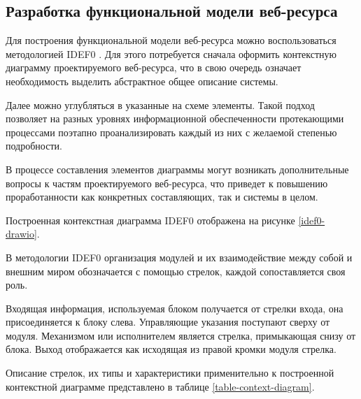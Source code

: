 \subsection{Разработка функциональной модели веб-ресурса}

Для построения функциональной модели веб-ресурса можно воспользоваться методологией IDEF0 \cite{wiki-idef0}.
Для этого потребуется сначала оформить контекстную диаграмму проектируемого веб-ресурса, что в свою очередь означает необходимость выделить абстрактное общее описание системы.

Далее можно углубляться в указанные на схеме элементы.
Такой подход позволяет на разных уровнях информационной обеспеченности протекающими процессами поэтапно проанализировать каждый из них с желаемой степенью подробности.

В процессе составления элементов диаграммы могут возникать дополнительные вопросы к частям проектируемого веб-ресурса, что приведет к повышению проработанности как конкретных составляющих, так и системы в целом.

Построенная контекстная диаграмма IDEF0 отображена на рисунке \ref{idef0-drawio}.


В методологии IDEF0 организация модулей и их взаимодействие между собой и внешним миром обозначается с помощью стрелок, каждой сопоставляется своя роль.

Входящая информация, используемая блоком получается от стрелки входа, она присоединяется к блоку слева.
Управляющие указания поступают сверху от модуля.
Механизмом или исполнителем является стрелка, примыкающая снизу от блока.
Выход отображается как исходящая из правой кромки модуля стрелка.

Описание стрелок, их типы и характеристики применительно к построенной контекстной диаграмме представлено в таблице \ref{table-context-diagram}.

